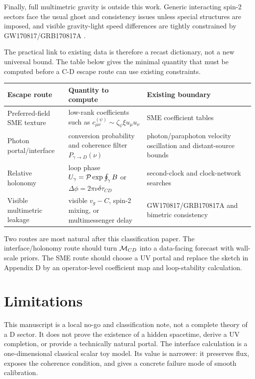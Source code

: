 \documentclass[11pt]{article}
\begin{document}
Finally, full multimetric gravity is outside this work. Generic interacting spin-2 sectors face the usual ghost and consistency issues unless special structures are imposed, and visible gravity-light speed differences are tightly constrained by GW170817/GRB170817A \citep{HassanRosen2011Bimetric,HassanRosen2011Secondary,LIGO2017GW170817GRB}.


The practical link to existing data is therefore a recast dictionary, not a new universal bound. The table below gives the minimal quantity that must be computed before a C-D escape route can use existing constraints.


\begin{center}
\small
\begin{tabularx}{\textwidth}{@{}>{\raggedright\arraybackslash}p{} >{\raggedright\arraybackslash}p{} >{\raggedright\arraybackslash}p{}@{}}
\toprule
Escape route & Quantity to compute & Existing boundary \\
\midrule
Preferred-field SME texture & low-rank coefficients such as \(c_{\mu\nu}^{(\psi)}\sim \zeta_\psi\xi u_\mu u_\nu\) & SME coefficient tables \\
Photon portal/interface & conversion probability and coherence filter \(P_{\gamma\to D}(\nu)\) & photon/paraphoton velocity oscillation and distant-source bounds \\
Relative holonomy & loop phase \(U_\gamma={\cal P}\exp\oint_\gamma B\) or \(\Delta\phi=2\pi\nu\delta\tau_{CD}\) & second-clock and clock-network searches \\
Visible multimetric leakage & visible \(v_g-C\), spin-2 mixing, or multimessenger delay & GW170817/GRB170817A and bimetric consistency \\
\bottomrule
\end{tabularx}
\end{center}


Two routes are most natural after this classification paper. The interface/holonomy route should turn \({\cal M}_{CD}\) into a data-facing forecast with wall-scale priors. The SME route should choose a UV portal and replace the sketch in Appendix D by an operator-level coefficient map and loop-stability calculation.


\section{Limitations}


This manuscript is a local no-go and classification note, not a complete theory of a D sector. It does not prove the existence of a hidden spacetime, derive a UV completion, or provide a technically natural portal. The interface calculation is a one-dimensional classical scalar toy model. Its value is narrower: it preserves flux, exposes the coherence condition, and gives a concrete failure mode of smooth calibration.
\end{document}
